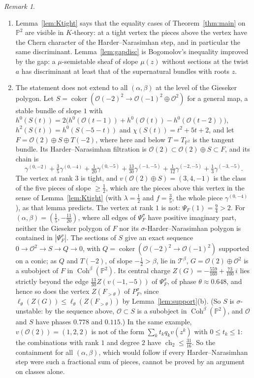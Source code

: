 \documentclass[11pt]{amsart}
\theoremstyle{definition}
\theoremstyle{remark}
\newtheorem{remark}[theorem]{Remark}
\newcommand{\PP}{\mathbb{P}}
\newcommand{\OO}{\mathcal{O}}
\DeclareMathOperator{\coker}{coker}
\begin{document}
\begin{remark}\label{rem:lvl}
\begin{enumerate}[label=(\arabic*)]
\item Lemma~\ref{lem:Ktight} says that the equality cases of Theorem~\ref{thm:main} on $\PP^2$ are visible in $K$-theory: at a tight vertex the pieces above the vertex have the Chern character of the Harder--Narasimhan step, and in particular the same discriminant. Lemma~\ref{lem:gapdisc} is Bogomolov's inequality improved by the gap: a $\mu$-semistable sheaf of slope $\mu(z)$ without sections at the twist $a$ has discriminant at least that of the supernatural bundles with roots $z$.
\item The statement does not extend to all $(\alpha,\beta)$ at the level of the Gieseker polygon. Let $S=\coker(\OO(-2)^2\to\OO(-1)^2\oplus\OO^2)$ for a general map, a stable bundle of slope $1$ with $h^0(S(t))=2\big(h^0(\OO(t-1))+h^0(\OO(t))-h^0(\OO(t-2))\big)$, $h^2(S(t))=h^0(S(-5-t))$ and $\chi(S(t))=t^2+5t+2$, and let $F=\OO(2)\oplus S\oplus T(-2)$, where here and below $T=T_{\PP^2}$ is the tangent bundle. Its Harder--Narasimhan filtration is $\OO(2)\subset\OO(2)\oplus S\subset F$, and its chain is
\[
\gamma^{(0,-2)}+\tfrac35\gamma^{(0,-4)}+\tfrac1{20}\gamma^{(0,-5)}+\tfrac{13}{30}\gamma^{(-1,-5)}+\tfrac1{12}\gamma^{(-2,-5)}+\tfrac13\gamma^{(-3,-5)} .
\]
The vertex at rank $3$ is tight, and $v(\OO(2)\oplus S)=(3,4,-1)$ is the class of the five pieces of slope $\ge\frac12$, which are the pieces above this vertex in the sense of Lemma~\ref{lem:Ktight} (with $\lambda=\frac12$ and $f=\frac35$, the whole piece $\gamma^{(0,-4)}$), as that lemma predicts. The vertex at rank $1$ is not: $\Psi_F(1)=\frac94>2$. For $(\alpha,\beta)=(\frac15,-\frac{11}{20})$, where all edges of $\Psi^\sigma_F$ have positive imaginary part, neither the Gieseker polygon of $F$ nor its $\sigma$-Harder--Narasimhan polygon is contained in $|\Psi^\sigma_F|$. The sections of $S$ give an exact sequence $0\to\OO^2\to S\to Q\to0$, with $Q=\coker(\OO(-2)^2\to\OO(-1)^2)$ supported on a conic; as $Q$ and $T(-2)$, of slope $-\frac12>\beta$, lie in $\mathcal T^\beta$, $G=\OO(2)\oplus\OO^2$ is a subobject of $F$ in $\operatorname{Coh}^\beta(\PP^2)$. Its central charge $Z(G)=-\frac{559}{160}+\frac{73}{100}\,i$ lies strictly beyond the edge $\frac{13}{30}Z(v(-1,-5))$ of $\Psi^\sigma_F$, of phase $\theta\approx0.648$, and hence so does the vertex $Z(F_{>\theta})$ of $P^\sigma_F$, since $\ell_\theta(Z(G))\le\ell_\theta(Z(F_{>\theta}))$ by Lemma~\ref{lem:support}(b). (So $S$ is $\sigma$-unstable: by the sequence above, $\OO\subset S$ is a subobject in $\operatorname{Coh}^\beta(\PP^2)$, and $\OO$ and $S$ have phases $0.778$ and $0.115$.) In the same example, $v(\OO(2))=(1,2,2)$ is not of the form $\sum_kt_kq_kv(z^k)$ with $0\le t_k\le1$: the combinations with rank $1$ and degree $2$ have $\operatorname{ch}_2\le\frac{31}{16}$. So the containment for all $(\alpha,\beta)$, which would follow if every Harder--Narasimhan step were such a fractional sum of pieces, cannot be proved by an argument on classes alone.

\end{enumerate}
\end{remark}
\end{document}
